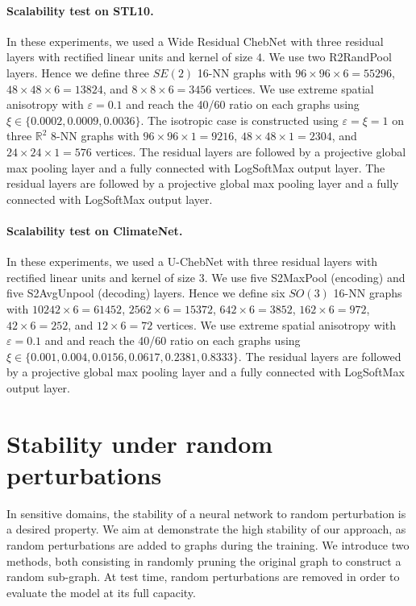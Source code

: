 \documentclass{article}
\begin{document}
\paragraph{Scalability test on STL10.} In these experiments, we used a Wide Residual ChebNet with three residual layers with rectified linear units and kernel of size $4$. We use two R2RandPool layers. Hence we define three $SE(2)$ 16-NN graphs with $96 \times 96 \times 6= 55296$, $48 \times 48 \times 6 = 13824$, and $8 \times 8 \times 6 = 3456$ vertices. We use extreme spatial anisotropy with $\varepsilon = 0.1$ and reach the 40/60 ratio on each graphs using $\xi \in \{0.0002, 0.0009, 0.0036\}$. The isotropic case is constructed using $\varepsilon = \xi = 1$ on three $\mathbb{R}^2$ 8-NN graphs with $96 \times 96 \times 1 = 9216$, $48 \times 48 \times 1 = 2304$, and $24 \times 24 \times 1 = 576$ vertices. The residual layers are followed by a projective global max pooling layer and a fully connected with LogSoftMax output layer. The residual layers are followed by a projective global max pooling layer and a fully connected with LogSoftMax output layer. 

\paragraph{Scalability test on ClimateNet.} In these experiments, we used a U-ChebNet with three residual layers with rectified linear units and kernel of size $3$. We use five S2MaxPool (encoding) and five S2AvgUnpool (decoding) layers. Hence we define six $SO(3)$ 16-NN graphs with $10242 \times 6= 61452$, $2562 \times 6 = 15372$, $642 \times 6 = 3852$, $162 \times 6 = 972$, $42 \times 6 = 252$, and $12 \times 6 = 72$ vertices. We use extreme spatial anisotropy with $\varepsilon = 0.1$ and and reach the 40/60 ratio on each graphs using $\xi \in \{0.001, 0.004, 0.0156, 0.0617, 0.2381, 0.8333\}$. The residual layers are followed by a projective global max pooling layer and a fully connected with LogSoftMax output layer. 

\clearpage

\section{Stability under random perturbations}

In sensitive domains, the stability of a neural network to random perturbation is a desired property. We aim at demonstrate the high stability of our approach, as random perturbations are added to graphs during the training. We introduce two methods, both consisting in randomly pruning the original graph to construct a random sub-graph. At test time, random perturbations are removed in order to evaluate the model at its full capacity. 
\end{document}
